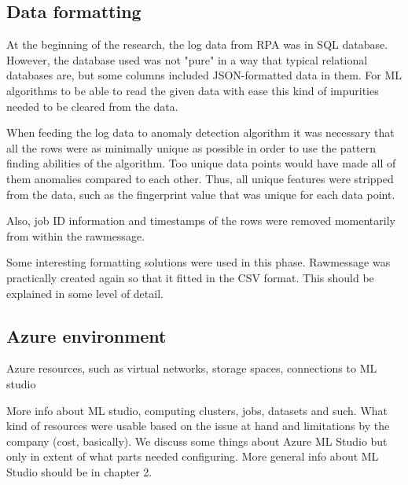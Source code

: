 \subsection{Data formatting}\label{subsubsec:data-formatting}
At the beginning of the research,
the log data from RPA was in SQL database.
However,
the database used was not "pure"
in a way that typical relational databases are,
but some columns included JSON-formatted data in them.
For ML algorithms to be able to read the given data with ease
this kind of impurities needed to be cleared from the data.

When feeding the log data to anomaly detection algorithm
it was necessary that all the rows were
as minimally unique as possible
in order to use the pattern finding abilities of the algorithm.
Too unique data points would have made all of them anomalies
compared to each other.
Thus, all unique features were stripped from the data,
such as the fingerprint value
that was unique for each data point.
\begin{itcomment}
    Also,
    job ID information and timestamps of the rows
    were removed momentarily from within the rawmessage.
\end{itcomment}

\begin{itcomment}
    Some interesting formatting solutions were used in this phase.
    Rawmessage was practically created again
    so that it fitted in the CSV format.
    This should be explained in some level of detail.
\end{itcomment}




\subsection{Azure environment}\label{subsec:meth-azure-environment}

\begin{itcomment}
    Azure resources, such as virtual networks, storage spaces, connections to ML studio \etc

    More info about ML studio,
    computing clusters, jobs, datasets and such.
    What kind of resources were usable based on the issue at hand
    and limitations by the company (cost, basically).
    We discuss some things about Azure ML Studio
    but only in extent of what parts needed configuring.
    More general info about ML Studio should be in chapter 2.
\end{itcomment}

